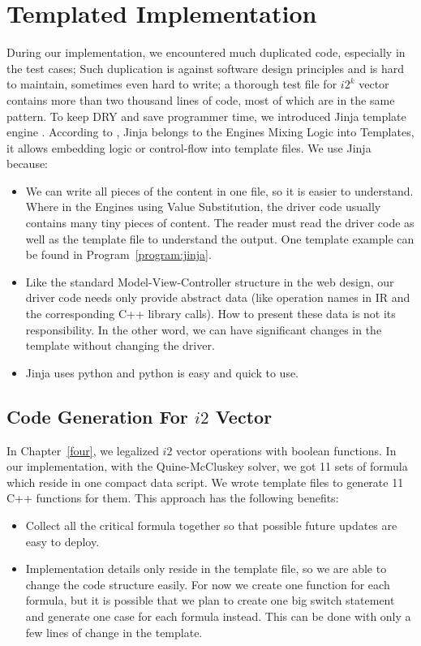 \section{Templated Implementation}
During our implementation, we encountered much duplicated code, especially in the test cases; Such duplication is against software design principles and is hard to maintain, sometimes even hard to write; a thorough test file for $i2^k$ vector contains more than two thousand lines of code, most of which are in the same pattern. To keep DRY and save programmer time, we introduced Jinja template engine \cite{jinja_engine}. According to \cite{python_templating}, Jinja belongs to the Engines Mixing Logic into Templates, it allows embedding logic or control-flow into template files. We use Jinja because:

\begin{itemize}
    \item We can write all pieces of the content in one file, so it is easier to understand. Where in the Engines using Value Substitution, the driver code usually contains many tiny pieces of content. The reader must read the driver code as well as the template file to understand the output. One template example can be found in Program~\ref{program:jinja}.
    \item Like the standard Model-View-Controller structure in the web design, our driver code needs only provide abstract data (like operation names in IR and the corresponding C++ library calls). How to present these data is not its responsibility. In the other word, we can have significant changes in the template without changing the driver.
    \item Jinja uses python and python is easy and quick to use.
\end{itemize}

\subsection{Code Generation For $i2$ Vector}
In Chapter~\ref{four}, we legalized $i2$ vector operations with boolean functions. In our implementation, with the Quine-McCluskey solver, we got 11 sets of formula which reside in one compact data script. We wrote template files to generate 11 C++ functions for them. This approach has the following benefits:
\begin{itemize}
    \item Collect all the critical formula together so that possible future updates are easy to deploy.
    \item Implementation details only reside in the template file, so we are able to change the code structure easily. For now we create one function for each formula, but it is possible that we plan to create one big switch statement and generate one case for each formula instead. This can be done with only a few lines of change in the template.
\end{itemize}

